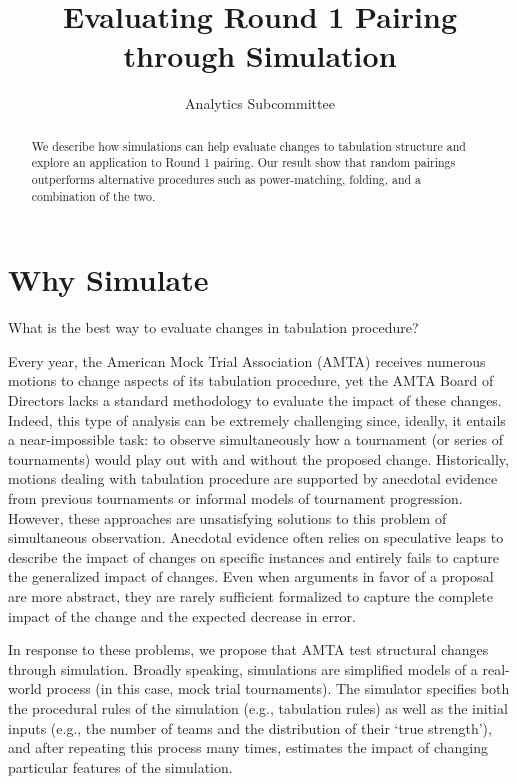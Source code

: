 \documentclass{tufte-handout}
\title{Evaluating Round 1 Pairing through Simulation%
}
\author{Analytics Subcommittee}
\begin{document}
\maketitle

\begin{abstract}
\noindent We describe how simulations can help evaluate 
changes to tabulation structure and explore an application to Round 1 pairing. Our result show that random pairings outperforms alternative procedures such as power-matching, folding, and a combination of the two.
\end{abstract}


\section{Why Simulate}
What is the best way to evaluate changes in tabulation procedure?

Every year, the American Mock Trial Association (AMTA) receives numerous motions to change aspects of its tabulation procedure, yet the AMTA Board of Directors lacks a standard methodology to evaluate the impact of these changes. Indeed, this type of analysis can be extremely challenging since, ideally, it entails a near-impossible task: to observe simultaneously how a tournament (or series of tournaments) would play out with and without the proposed change. %
Historically, motions dealing with tabulation procedure are supported by anecdotal evidence from previous tournaments or informal models of tournament progression. However, these approaches are unsatisfying solutions to this problem of simultaneous observation. Anecdotal evidence often relies on speculative leaps to describe the impact of changes on specific instances and entirely fails to capture the generalized impact of changes. Even when arguments in favor of a proposal are more abstract, they are rarely sufficient formalized to capture the complete impact of the change and the expected decrease in error.

In response to these problems, we propose that AMTA test structural changes through simulation. Broadly speaking, simulations are simplified models of a real-world process (in this case, mock trial tournaments). The simulator specifies both the procedural rules of the simulation (e.g., tabulation rules) as well as the initial inputs (e.g., the number of teams and the distribution of their `true strength'), and after repeating this process many times, estimates the impact of changing particular features of the simulation.
\end{document}
